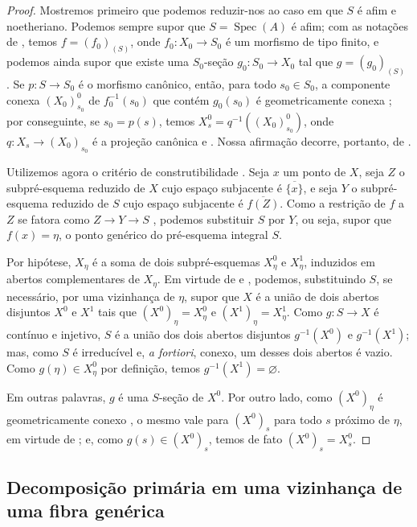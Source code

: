 \begin{proof}
Mostremos primeiro que podemos reduzir-nos ao caso em que $S$ é afim e noetheriano. Podemos sempre supor que $S=\operatorname{Spec}(A)$ é afim; com as notações de , temos $f=(f_0)_{(S)}$, onde $f_0:X_0\to S_0$ é um morfismo de tipo finito, e podemos ainda supor que existe uma $S_0$-seção $g_0:S_0\to X_0$ tal que $g=(g_0)_{(S)}$ . Se $p:S\to S_0$ é o morfismo canônico, então, para todo $s_0\in S_0$, a componente conexa $(X_0)^0_{s_0}$ de $f_0^{-1}(s_0)$ que contém $g_0(s_0)$ é geometricamente conexa ; por conseguinte, se $s_0=p(s)$, temos $X_s^0=q^{-1}((X_0)^0_{s_0})$, onde $q:X_s\to (X_0)_{s_0}$ é a projeção canônica  e . Nossa afirmação decorre, portanto, de .

Utilizemos agora o critério de construtibilidade . Seja $x$ um ponto de $X$, seja $Z$ o subpré-esquema reduzido de $X$ cujo espaço subjacente é $\overline{\{x\}}$, e seja $Y$ o subpré-esquema reduzido de $S$ cujo espaço subjacente é $\overline{f(Z)}$. Como a restrição de $f$ a $Z$ se fatora como $Z\to Y\to S$ , podemos substituir $S$ por $Y$, ou seja, supor que $f(x)=\eta$, o ponto genérico do pré-esquema integral $S$.

Por hipótese, $X_\eta$ é a soma de dois subpré-esquemas $X_\eta^0$ e $X_\eta^1$, induzidos em abertos complementares de $X_\eta$. Em virtude de  e , podemos, substituindo $S$, se necessário, por uma vizinhança de $\eta$, supor que $X$ é a união de dois abertos disjuntos $X^0$ e $X^1$ tais que $(X^0)_\eta=X_\eta^0$ e $(X^1)_\eta=X_\eta^1$. Como $g:S\to X$ é contínuo e injetivo, $S$ é a união dos dois abertos disjuntos $g^{-1}(X^0)$ e $g^{-1}(X^1)$; mas, como $S$ é irreducível e, \emph{a fortiori}, conexo, um desses dois abertos é vazio. Como $g(\eta)\in X_\eta^0$ por definição, temos $g^{-1}(X^1)=\varnothing$.

Em outras palavras, $g$ é uma $S$-seção de $X^0$. Por outro lado, como $(X^0)_\eta$ é geometricamente conexo , o mesmo vale para $(X^0)_s$ para todo $s$ próximo de $\eta$, em virtude de ; e, como $g(s)\in (X^0)_s$, temos de fato $(X^0)_s=X_s^0$.
\end{proof}

\subsection{Decomposição primária em uma vizinhança de uma fibra genérica}
\label{subsection:IV.9.8}
\label{IV.9.8}

